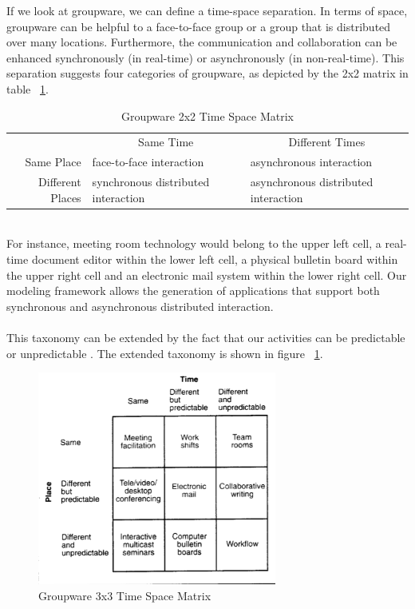If we look at groupware, we can define a time-space separation. In terms of space, groupware can be helpful to a face-to-face group or a group that is distributed over many locations. Furthermore, the communication and collaboration can be enhanced synchronously (in real-time) or asynchronously (in non-real-time). This separation suggests four categories of groupware, as depicted by the 2x2 matrix in table ~\ref{tab:groupware_taxonomy}.
\begin{table}[h!p!]
\begin{tabular*}{0.75\textwidth}{ r | p{5cm} | p{5cm} |}
\multicolumn{1}{r}{}
 &  \multicolumn{1}{c}{Same Time}
 & \multicolumn{1}{c}{Different Times} \\
\cline{2-3}
Same Place & face-to-face interaction & asynchronous interaction \\
\cline{2-3}
Different Places & synchronous distributed interaction & asynchronous distributed interaction \\
\cline{2-3}
\end{tabular*}
\caption{Groupware 2x2 Time Space Matrix}
\label{tab:groupware_taxonomy}
\end{table}
\\
For instance, meeting room technology would belong to the upper left cell, a real-time document editor within the lower left cell, a physical bulletin board within the upper right cell and an electronic mail system within the lower right cell. Our modeling framework allows the generation of applications that support both synchronous and asynchronous distributed interaction. 
\\ \\
This taxonomy can be extended by the fact that our activities can be predictable or unpredictable \cite{CSCLHistory2}. The extended taxonomy is shown in figure ~\ref{fig:ext_taxonomy}.
\begin{figure}[h!]
\centering
\includegraphics[width=0.7\textwidth]{images/chap5_3by3matrix.png}
\caption{Groupware 3x3 Time Space Matrix}
\label{fig:ext_taxonomy}
\end{figure}
